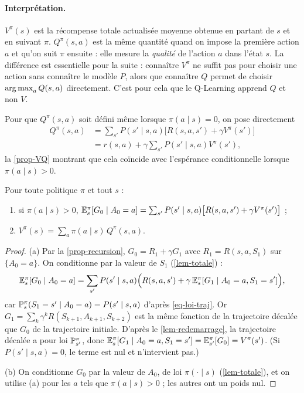 \paragraph{Interprétation.} $V^\pi(s)$ est la récompense totale actualisée moyenne obtenue en partant de $s$ et en suivant $\pi$. $Q^\pi(s,a)$ est la même quantité quand on impose la première action $a$ et qu'on suit $\pi$ ensuite : elle mesure la \emph{qualité} de l'action $a$ dans l'état $s$. La différence est essentielle pour la suite : connaître $V^\pi$ ne suffit pas pour choisir une action sans connaître le modèle $P$, alors que connaître $Q$ permet de choisir $\argmax_a Q(s,a)$ directement. C'est pour cela que le Q-Learning apprend $Q$ et non $V$.

Pour que $Q^\pi(s,a)$ soit défini même lorsque $\pi(a\mid s)=0$, on pose directement
\begin{equation}\label{eq-Q-from-V}
\begin{split}
Q^\pi(s,a)&=\sum_{s'}P(s'\mid s,a)\big[R(s,a,s')+\gamma V^\pi(s')\big]\\
&=r(s,a)+\gamma\sum_{s'}P(s'\mid s,a)V^\pi(s'),
\end{split}
\end{equation}
la \cref{prop-VQ} montrant que cela coïncide avec l'espérance conditionnelle lorsque $\pi(a\mid s)>0$.

\begin{proposition}\label{prop-VQ}
Pour toute politique $\pi$ et tout $s$ :
\begin{enumerate}[label=(\alph*)]
\item si $\pi(a\mid s)>0$, $\E^\pi_s[G_0\mid A_0=a]=\sum_{s'}P(s'\mid s,a)\big[R(s,a,s')+\gamma V^\pi(s')\big]$ ;
\item $V^\pi(s)=\sum_a\pi(a\mid s)\,Q^\pi(s,a)$.
\end{enumerate}
\end{proposition}
\begin{proof}
(a) Par la \cref{prop-recursion}, $G_0=R_1+\gamma G_1$ avec $R_1=R(s,a,S_1)$ sur $\{A_0=a\}$. On conditionne par la valeur de $S_1$ (\cref{lem-totale}) :
\[
\E^\pi_s[G_0\mid A_0=a]=\sum_{s'}P(s'\mid s,a)\Big(R(s,a,s')+\gamma\,\E^\pi_s[G_1\mid A_0=a,S_1=s']\Big),
\]
car $\P^\pi_s(S_1=s'\mid A_0=a)=P(s'\mid s,a)$ d'après \eqref{eq-loi-traj}. Or $G_1=\sum_k\gamma^kR(S_{k+1},A_{k+1},S_{k+2})$ est la même fonction de la trajectoire décalée que $G_0$ de la trajectoire initiale. D'après le \cref{lem-redemarrage}, la trajectoire décalée a pour loi $\P^\pi_{s'}$, donc $\E^\pi_s[G_1\mid A_0=a,S_1=s']=\E^\pi_{s'}[G_0]=V^\pi(s')$. (Si $P(s'\mid s,a)=0$, le terme est nul et n'intervient pas.)

(b) On conditionne $G_0$ par la valeur de $A_0$, de loi $\pi(\cdot\mid s)$ (\cref{lem-totale}), et on utilise (a) pour les $a$ tels que $\pi(a\mid s)>0$ ; les autres ont un poids nul.
\end{proof}

